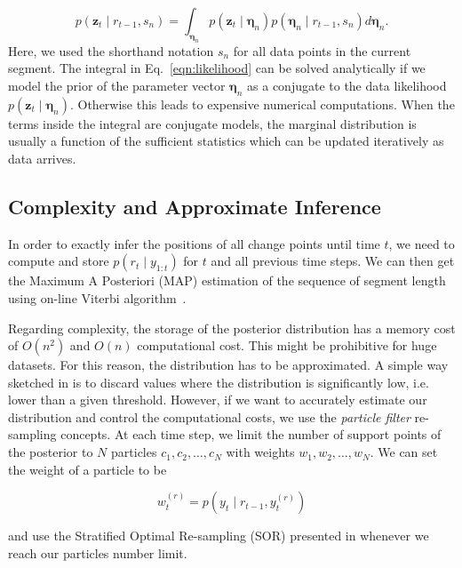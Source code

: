\begin{equation}
\label{eqn:likelihood}
p(\mathbf{z}_t\mid r_{t-1},s_n) = \int_{\boldsymbol{\eta}_{n}}
  p(\mathbf{z}_t\mid \boldsymbol{\eta}_{n})p(\boldsymbol{\eta}_{n}\mid r_{t-1},s_n)
  d\boldsymbol{\eta}_{n}.
\end{equation}
Here, we used the shorthand notation $s_n$ for all data points in the
current segment. The integral in Eq.~\eqref{eqn:likelihood} can be
solved analytically if we model the prior of the parameter vector
$\boldsymbol{\eta}_{n}$ as a conjugate to the data likelihood
$p(\mathbf{z}_t\mid \boldsymbol{\eta}_{n})$. Otherwise this leads to
expensive numerical computations. When the terms inside the integral
are conjugate models, the marginal distribution is usually a function
of the sufficient statistics which can be updated iteratively as data
arrives.

\subsection{Complexity and Approximate Inference}
In order to exactly infer the positions of all change points until
time $t$, we need to compute and store $p(r_t\mid y_{1:t})$ for $t$
and all previous time steps. We can then get the Maximum A Posteriori (MAP)
estimation of the sequence of segment length using on-line Viterbi
algorithm~\cite{fearnhead07online}.

Regarding complexity, the storage of the posterior distribution has a
memory cost of $O(n^2)$ and $O(n)$ computational cost. This might be
prohibitive for huge datasets. For this reason, the distribution has
to be approximated. A simple way sketched in \cite{adams07bayesian} is
to discard values where the distribution is significantly low, i.e.
lower than a given threshold. However, if we want to accurately
estimate our distribution and control the computational costs, we use
the \emph{particle filter} re-sampling concepts. At each time step, we
limit the number of support points of the posterior to $N$ particles
$c_1,c_2,\dots,c_N$ with weights $w_1,w_2,\dots,w_N$. We can set the
weight of a particle to be

\begin{equation}
\label{eqn:weight}
w_t^{(r)} = p(y_t\mid r_{t-1},y_t^{(r)})
\end{equation}

and use the Stratified Optimal Re-sampling (SOR) presented in
\cite{fearnhead07online} whenever we reach our particles number limit.

